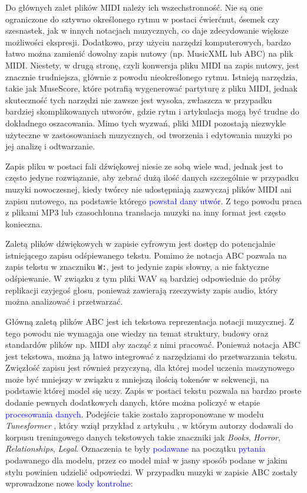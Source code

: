 \documentclass[data-science]{agh-wi} %
\begin{document}
Do głównych zalet plików MIDI należy ich wszechstronność. Nie są one ograniczone do sztywno określonego rytmu w postaci ćwierćnut, ósemek czy szesnastek, jak w innych notacjach muzycznych, co daje zdecydowanie większe możliwości ekspresji. Dodatkowo, przy użyciu narzędzi komputerowych, bardzo łatwo można zamienić dowolny zapis nutowy (np. MusicXML lub ABC) na plik MIDI. Niestety, w drugą stronę, czyli konwersja pliku MIDI na zapis nutowy, jest znacznie trudniejsza, głównie z powodu nieokreślonego rytmu. Istnieją narzędzia, takie jak MuseScore, które potrafią wygenerować partyturę z pliku MIDI, jednak skuteczność tych narzędzi nie zawsze jest wysoka, zwłaszcza w przypadku bardziej skomplikowanych utworów, gdzie rytm i artykulacja mogą być trudne do dokładnego oszacowania. Mimo tych wyzwań, pliki MIDI pozostają niezwykle użyteczne w zastosowaniach muzycznych, od tworzenia i edytowania muzyki po jej analizę i odtwarzanie.

Zapis pliku w postaci fali dźwiękowej niesie ze sobą wiele wad, jednak jest to często jedyne rozwiązanie, aby zebrać dużą ilość danych szczególnie w przypadku muzyki nowoczesnej, kiedy twórcy nie udostępniają zazwyczaj plików MIDI ani zapisu nutowego, na podstawie którego \textcolor{blue}{powstał dany utwór}. Z tego powodu praca z plikami MP3 lub czasochłonna translacja muzyki na inny format jest często konieczna.

Zaletą plików dźwiękowych w zapisie cyfrowym jest dostęp do potencjalnie istniejącego zapisu odśpiewanego tekstu. Pomimo że notacja ABC pozwala na zapis tekstu w znaczniku \texttt{W:}, jest to jedynie zapis słowny, a nie faktyczne odśpiewanie. W związku z tym pliki WAV są bardziej odpowiednie do próby replikacji czyjegoś głosu, ponieważ zawierają rzeczywisty zapis audio, który można analizować i przetwarzać.

Główną zaletą plików ABC jest ich tekstowa reprezentacja notacji muzycznej. Z tego powodu nie wymagaja one wiedzy na temat struktury, budowy oraz standardów plików np. MIDI aby zacząć z nimi pracować. Ponieważ notacja ABC jest tekstowa, można ją łatwo integrować z narzędziami do przetwarzania tekstu. Zwięzłość zapisu jest również przyczyną, dla której model uczenia maszynowego może być mniejszy w związku z mniejszą ilością tokenów w sekwencji, na podstawie której model się uczy. Zapis w postaci tekstu pozwala na bardzo proste dodanie pewnych dodatkowych danych, które można policzyć w etapie \textcolor{blue}{procesowania danych}. Podejście takie zostało zaproponowane w modelu \textit{Tunesformer} \cite{tunesformer}, który wziął przykład z artykułu \cite{keskarCTRL2019}, w którym autorzy dodawali do korpusu treningowego danych tekstowych takie znaczniki jak \textit{Books}, \textit{Horror}, \textit{Relationships}, \textit{Legal}. Oznaczenia te były \textcolor{blue}{podawane} na początku \textcolor{blue}{pytania} podawanego dla modelu, przez co model miał w jasny sposób podane w jakim stylu powinien udzielić odpowiedzi. W przypadku muzyki w zapisie ABC zostały wprowadzone nowe \textcolor{blue}{kody kontrolne}:
\end{document}

